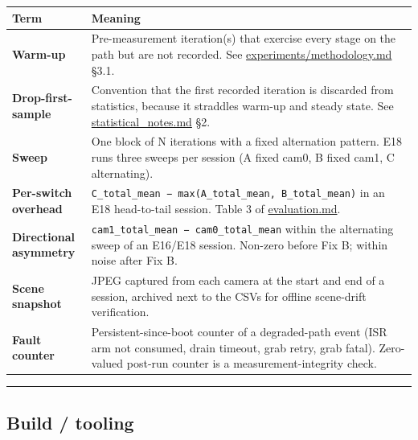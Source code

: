 {\def\LTcaptype{none} %
\begin{longtable}[]{@{}
  >{\raggedright\arraybackslash}p{}
  >{\raggedright\arraybackslash}p{}@{}}
\toprule\noalign{}
\begin{minipage}[b]{\linewidth}\raggedright
Term
\end{minipage} & \begin{minipage}[b]{\linewidth}\raggedright
Meaning
\end{minipage} \\
\midrule\noalign{}
\endhead
\bottomrule\noalign{}
\endlastfoot
\textbf{Warm-up} & Pre-measurement iteration(s) that exercise every
stage on the path but are not recorded. See
\href{../experiments/methodology.md}{experiments/methodology.md}
§3.1. \\
\textbf{Drop-first-sample} & Convention that the first recorded
iteration is discarded from statistics, because it straddles warm-up and
steady state. See \url{statistical_notes.md} §2. \\
\textbf{Sweep} & One block of N iterations with a fixed alternation
pattern. E18 runs three sweeps per session (A fixed cam0, B fixed cam1,
C alternating). \\
\textbf{Per-switch overhead} &
\texttt{C\_total\_mean\ −\ max(A\_total\_mean,\ B\_total\_mean)} in an
E18 head-to-tail session. Table 3 of \url{evaluation.md}. \\
\textbf{Directional asymmetry} &
\texttt{cam1\_total\_mean\ −\ cam0\_total\_mean} within the alternating
sweep of an E16/E18 session. Non-zero before Fix B; within noise after
Fix B. \\
\textbf{Scene snapshot} & JPEG captured from each camera at the start
and end of a session, archived next to the CSVs for offline scene-drift
verification. \\
\textbf{Fault counter} & Persistent-since-boot counter of a
degraded-path event (ISR arm not consumed, drain timeout, grab retry,
grab fatal). Zero-valued post-run counter is a measurement-integrity
check. \\
\end{longtable}
}

\begin{center}\rule{0.5\linewidth}{0.5pt}\end{center}

\subsection{Build / tooling}\label{build-tooling}

